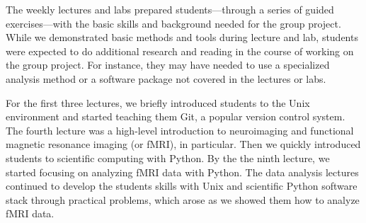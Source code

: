 

The weekly lectures and labs prepared students---through a
series of guided exercises---with the basic skills and
background needed for the group project.
While we demonstrated basic methods and tools during lecture and lab,
students were expected to do additional research and reading in the course
of working on the group project.
For instance, they may have needed to use a specialized analysis
method or a software package not covered in the lectures or labs.

For the first three lectures, we briefly introduced students to the Unix
environment and started teaching them Git, a popular version control system.
The fourth lecture was a high-level introduction to neuroimaging and
functional magnetic resonance imaging (or fMRI), in particular.
Then we quickly introduced students to scientific computing with Python.
By the the ninth lecture, we started focusing on analyzing fMRI data
with Python.
The data analysis lectures continued to develop the students skills with
Unix and scientific Python software stack through practical problems,
which arose as we showed them how to analyze fMRI data.




